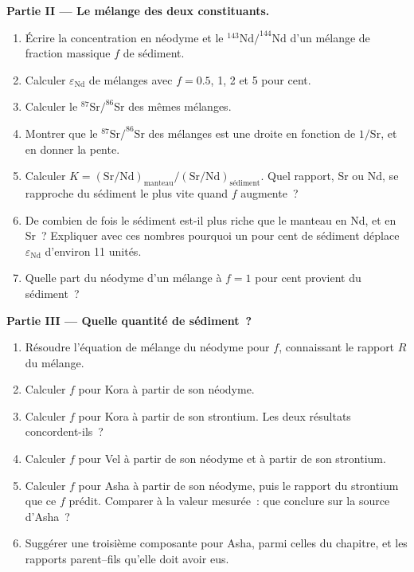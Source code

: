 \begin{problem}
\noindent\textbf{Partie II --- Le mélange des deux constituants.}
\begin{enumerate}[resume]
\item Écrire la concentration en néodyme et le $^{143}\mathrm{Nd}/^{144}\mathrm{Nd}$ d'un
mélange de fraction massique $f$ de sédiment.
\item Calculer $\varepsilon_{\mathrm{Nd}}$ de mélanges avec $f = 0.5$, 1, 2 et 5 pour
cent.
\item Calculer le $^{87}\mathrm{Sr}/^{86}\mathrm{Sr}$ des mêmes mélanges.
\item Montrer que le $^{87}\mathrm{Sr}/^{86}\mathrm{Sr}$ des mélanges est une droite
en fonction de $1/\mathrm{Sr}$, et en donner la pente.
\item Calculer $K = (\mathrm{Sr}/\mathrm{Nd})_{\text{manteau}}/(\mathrm{Sr}/\mathrm{Nd})_{\text{sédiment}}$.
Quel rapport, Sr ou Nd, se rapproche du sédiment le plus vite quand $f$ augmente~?
\item De combien de fois le sédiment est-il plus riche que le manteau en Nd, et en Sr~?
Expliquer avec ces nombres pourquoi un pour cent de sédiment déplace
$\varepsilon_{\mathrm{Nd}}$ d'environ 11 unités.
\item Quelle part du néodyme d'un mélange à $f = 1$ pour cent provient du
sédiment~?
\end{enumerate}

\noindent\textbf{Partie III --- Quelle quantité de sédiment~?}
\begin{enumerate}[resume]
\item Résoudre l'équation de mélange du néodyme pour $f$, connaissant le rapport $R$ du mélange.
\item Calculer $f$ pour Kora à partir de son néodyme.
\item Calculer $f$ pour Kora à partir de son strontium. Les deux résultats concordent-ils~?
\item Calculer $f$ pour Vel à partir de son néodyme et à partir de son strontium.
\item Calculer $f$ pour Asha à partir de son néodyme, puis le rapport du strontium que
ce $f$ prédit. Comparer à la valeur mesurée~: que conclure sur la
source d'Asha~?
\item Suggérer une troisième composante pour Asha, parmi celles du chapitre, et les
rapports parent--fils qu'elle doit avoir eus.
\end{enumerate}


\end{problem}
